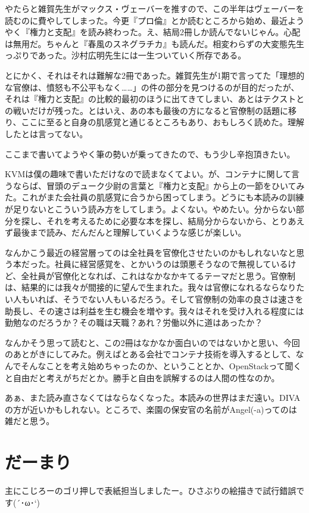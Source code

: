 ﻿\documentclass[9pt,b5paper,tombo,openany]{jsbook}
\begin{document}
やたらと雑賀先生がマックス・ヴェーバーを推すので、この半年はヴェーバーを読むのに費やしてしまった。今更『プロ倫』とか読むところから始め、最近ようやく『権力と支配』を読み終わった。え、結局2冊しか読んでないじゃん。心配は無用だ。ちゃんと『春風のスネグラチカ』も読んだ。相変わらずの大変態先生っぷりであった。沙村広明先生には一生ついていく所存である。

とにかく、それはそれは難解な2冊であった。雑賀先生が1期で言ってた「理想的な官僚は、憤怒も不公平もなく……」の件の部分を見つけるのが目的だったが、それは『権力と支配』の比較的最初のほうに出てきてしまい、あとはテクストとの戦いだけが残った。とはいえ、あの本も最後の方になると官僚制の話題に移り、ここに至ると自身の肌感覚と通じるところもあり、おもしろく読めた。理解したとは言ってない。

ここまで書いてようやく筆の勢いが乗ってきたので、もう少し辛抱頂きたい。

KVMは僕の趣味で書いただけなので読まなくてよい。が、コンテナに関して言うならば、冒頭のデューク少尉の言葉と『権力と支配』から上の一節をひいてみた。これがまた会社員の肌感覚に合うから困ってしまう。どうにも本読みの訓練が足りないとこういう読み方をしてしまう。よくない。やめたい。分からない部分を探し、それを考えるために必要な本を探し、結局分からないから、とりあえず最後まで読み、だんだんと理解していくような感じが楽しい。

なんかこう最近の経営層ってのは全社員を官僚化させたいのかもしれないなと思う本だった。社員に経営感覚を、とかいうのは頭悪そうなので無視しているけど、全社員が官僚化となれば、これはなかなかキてるテーマだと思う。官僚制は、結果的には我々が間接的に望んで生まれた。我々は官僚になれるならなりたい人もいれば、そうでない人もいるだろう。そして官僚制の効率の良さは速さを助長し、その速さは利益を生む機会を増やす。我々はそれを受け入れる程度には勤勉なのだろうか？その職は天職？あれ？労働以外に道はあったか？

なんかそう思って読むと、この2冊はなかなか面白いのではないかと思い、今回のあとがきにしてみた。例えばとある会社でコンテナ技術を導入するとして、なんでそんなことを考え始めちゃったのか、ということとか、OpenStackって聞くと自由だと考えがちだとか。勝手と自由を誤解するのは人間の性なのか。

あぁ、また読み直さなくてはならなくなった。本読みの世界はまだ遠い。DIVAの方が近いかもしれない。ところで、楽園の保安官の名前がAngel(-a)ってのは雑だと思う。

\section*{だーまり}
主にこじろーのゴリ押しで表紙担当しましたー。ひさぶりの絵描きで試行錯誤です(´･ω･`)
\end{document}
